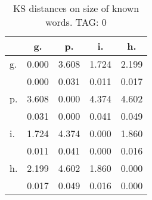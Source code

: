 \begin{table}[h!]
\begin{center}
\begin{tabular}{| l | c | c | c | c |}\hline
 & g. & p. & i. & h. \\\hline
g. & 0.000  & 3.608  & 1.724  & 2.199 \\\hline
 & 0.000  & 0.031  & 0.011  & 0.017 \\\hline
p. & 3.608  & 0.000  & 4.374  & 4.602 \\\hline
 & 0.031  & 0.000  & 0.041  & 0.049 \\\hline
i. & 1.724  & 4.374  & 0.000  & 1.860 \\\hline
 & 0.011  & 0.041  & 0.000  & 0.016 \\\hline
h. & 2.199  & 4.602  & 1.860  & 0.000 \\\hline
 & 0.017  & 0.049  & 0.016  & 0.000 \\\hline
\end{tabular}
\caption{KS distances on size of known words. TAG: 0}
\end{center}
\end{table}